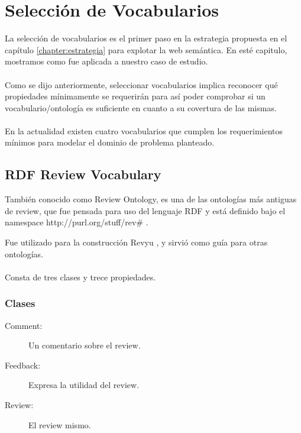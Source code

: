 \chapter{Selección de Vocabularios}
\label{chapter:seleccion}
La selección de vocabularios es el primer paso en la estrategia propuesta en el capítulo \ref{chapter:estrategia} para explotar la web semántica. En esté capitulo, mostramos como fue aplicada a nuestro caso de estudio.
\\\\
Como se dijo anteriormente, seleccionar vocabularios implica reconocer qué \\\noindent propiedades mínimamente se requerirán para así poder comprobar 
si un vocabulario/ontología es suficiente en cuanto a su covertura de las mismas.\\\\

En la actualidad existen cuatro vocabularios que cumplen los requerimientos mínimos para modelar el dominio de problema planteado.

\section{RDF Review Vocabulary}
\label{section:review-ontology}

También conocido como Review Ontology, es una de las ontologías más antiguas de review, que fue pensada para uso del lenguaje 
RDF y está definido bajo el namespace http://purl.org/stuff/rev\# .

Fue utilizado para la construcción Revyu , y sirvió como guía para otras ontologías.
\\\\
Consta de tres clases y trece propiedades.
\subsection{Clases}
\begin{description}
  \item [Comment:] Un comentario sobre el review. 
  \item [Feedback:] Expresa la utilidad del review. 
  \item [Review:] El review mismo. 
\end{description}

